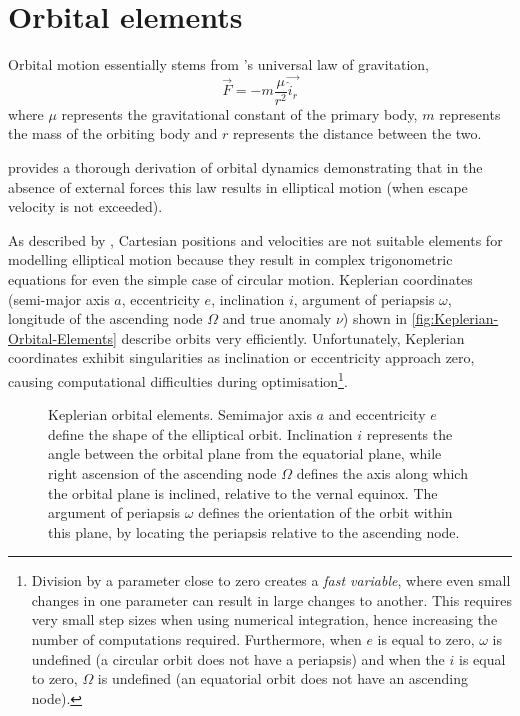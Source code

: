 \section{Orbital elements} \label{sec:Orbital-Elements}

Orbital motion essentially stems from \textcite{Newton1687}'s universal law of gravitation, 
\begin{equation}
\vec{F}=-m\frac{\mu}{r^{2}}\vec{\hat{i}_{r}} \label{eq:Fgravity}
\end{equation}
where $\mu$ represents the gravitational constant of the primary body, $m$  represents the mass of the orbiting body and $r$ represents the distance between the two.
 
\textcite{Kaplan1976} provides a thorough derivation of orbital dynamics demonstrating that in the absence of external forces this law results in elliptical motion (when escape velocity is not exceeded). %

As described by \textcite{Letterio_thesis}, Cartesian positions and velocities are not suitable elements for modelling elliptical motion because they result in complex trigonometric equations for even the simple case of circular motion. Keplerian coordinates (semi-major axis $a$, eccentricity $e$, inclination $i$, argument of periapsis $\omega$, longitude of the ascending node $\Omega$ and true anomaly $\nu$) shown in \autoref{fig:Keplerian-Orbital-Elements} describe orbits very efficiently. Unfortunately, Keplerian coordinates exhibit singularities as inclination or eccentricity approach zero, causing computational difficulties during optimisation\footnote{Division by a parameter close to zero creates a \emph{fast variable}, where even small changes in one parameter can result in large changes to another. This requires very small step sizes when using numerical integration, hence increasing the number of computations required. Furthermore, when $e$ is equal to zero, $\omega$ is undefined (a circular orbit does not have a periapsis) and when the $i$ is equal to zero, $\Omega$ is undefined (an equatorial orbit does not have an ascending node).}.


\begin{figure} [h]
\centering
\def\svgwidth{0.8\textwidth}

\caption{Keplerian orbital elements. Semimajor axis $a$ and eccentricity $e$ define the shape of the elliptical orbit. Inclination $i$ represents the angle between the orbital plane from the equatorial plane, while right ascension of the ascending node $\Omega$ defines the axis along which the orbital plane is inclined, relative to the vernal equinox. The argument of periapsis $\omega$ defines the orientation of the orbit within this plane, by locating the periapsis relative to the ascending node. %
} \label{fig:Keplerian-Orbital-Elements}
\end{figure}

